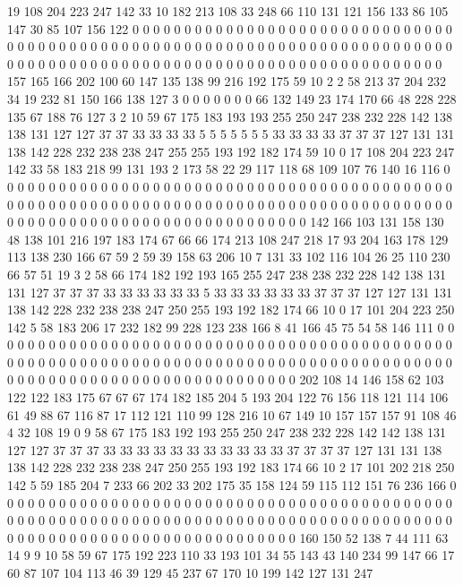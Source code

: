 19 108 204 223 247 142 33 10 182 213 108 33 248 66 110 131 121 156 133 86
105 147 30 85 107 156 122 0 0 0 0 0 0 0 0 0 0 0 0 0
0 0 0 0 0 0 0 0 0 0 0 0 0 0 0 0 0 0 0 0
0 0 0 0 0 0 0 0 0 0 0 0 0 0 0 0 0 0 0 0
0 0 0 0 0 0 0 0 0 0 0 0 0 0 0 0 0 0 0 0
0 0 0 0 0 0 0 0 0 0 0 0 0 0 0 0 0 0 0 0
0 0 0 0 0 0 0 0 0 0 0 0 0 0 0 0 0 0 0 0
0 0 0 157 165 166 202 100 60 147 135 138 99 216 192 175 59 10 2 2
58 213 37 204 232 34 19 232 81 150 166 138 127 3 0 0 0 0 0 0
0 66 132 149 23 174 170 66 48 228 228 135 67 188 76 127 3 2 10 59
67 175 183 193 193 255 250 247 238 232 228 142 138 138 131 127 127 37 37 33
33 33 33 5 5 5 5 5 5 5 33 33 33 33 37 37 37 127 131 131
138 142 228 232 238 238 247 255 255 193 192 182 174 59 10 0 17 108 204 223
247 142 33 58 183 218 99 131 193 2 173 58 22 29 117 118 68 109 107 76
140 16 116 0 0 0 0 0 0 0 0 0 0 0 0 0 0 0 0 0
0 0 0 0 0 0 0 0 0 0 0 0 0 0 0 0 0 0 0 0
0 0 0 0 0 0 0 0 0 0 0 0 0 0 0 0 0 0 0 0
0 0 0 0 0 0 0 0 0 0 0 0 0 0 0 0 0 0 0 0
0 0 0 0 0 0 0 0 0 0 0 0 0 0 0 0 0 0 0 0
0 0 0 0 0 0 0 0 0 0 0 0 0 0 0 0 0 0 0 142
166 103 131 158 130 48 138 101 216 197 183 174 67 66 66 174 213 108 247 218
17 93 204 163 178 129 113 138 230 166 67 59 2 59 39 158 63 206 10 7
131 33 102 116 104 26 25 110 230 66 57 51 19 3 2 58 66 174 182 192
193 165 255 247 238 238 232 228 142 138 131 131 127 37 37 37 33 33 33 33
33 33 5 33 33 33 33 33 33 37 37 37 127 127 131 131 138 142 228 232
238 238 247 250 255 193 192 182 174 66 10 0 17 101 204 223 250 142 5 58
183 206 17 232 182 99 228 123 238 166 8 41 166 45 75 54 58 146 111 0
0 0 0 0 0 0 0 0 0 0 0 0 0 0 0 0 0 0 0 0
0 0 0 0 0 0 0 0 0 0 0 0 0 0 0 0 0 0 0 0
0 0 0 0 0 0 0 0 0 0 0 0 0 0 0 0 0 0 0 0
0 0 0 0 0 0 0 0 0 0 0 0 0 0 0 0 0 0 0 0
0 0 0 0 0 0 0 0 0 0 0 0 0 0 0 0 0 0 0 0
0 0 0 0 0 0 0 0 0 0 0 0 0 0 0 202 108 14 146 158
62 103 122 122 183 175 67 67 67 174 182 185 204 5 193 204 122 76 156 118
121 114 106 61 49 88 67 116 87 17 112 121 110 99 128 216 10 67 149 10
157 157 157 91 108 46 4 32 108 19 0 9 58 67 175 183 192 193 255 250
247 238 232 228 142 142 138 131 127 127 37 37 37 33 33 33 33 33 33 33
33 33 33 33 37 37 37 37 127 131 131 138 138 142 228 232 238 238 247 250
255 193 192 183 174 66 10 2 17 101 202 218 250 142 5 59 185 204 7 233
66 202 33 202 175 35 158 124 59 115 112 151 76 236 166 0 0 0 0 0
0 0 0 0 0 0 0 0 0 0 0 0 0 0 0 0 0 0 0 0
0 0 0 0 0 0 0 0 0 0 0 0 0 0 0 0 0 0 0 0
0 0 0 0 0 0 0 0 0 0 0 0 0 0 0 0 0 0 0 0
0 0 0 0 0 0 0 0 0 0 0 0 0 0 0 0 0 0 0 0
0 0 0 0 0 0 0 0 0 0 0 0 0 0 0 0 0 0 0 0
0 0 0 0 0 0 0 0 0 0 160 150 52 138 7 44 111 63 14 9
9 10 58 59 67 175 192 223 110 33 193 101 34 55 143 43 140 234 99 147
66 17 60 87 107 104 113 46 39 129 45 237 67 170 10 199 142 127 131 247

